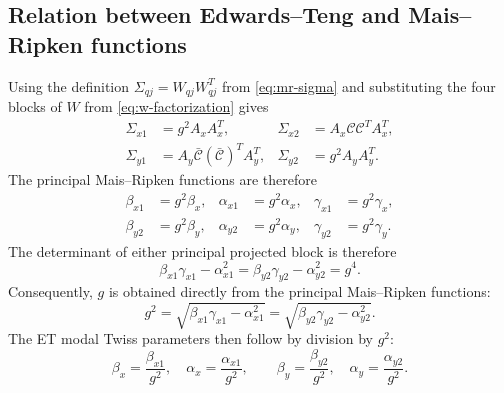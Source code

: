 \subsection{Relation between Edwards--Teng and Mais--Ripken functions}

Using the definition $\Sigma_{qj}=W_{qj}W_{qj}^T$ from
\cref{eq:mr-sigma} and substituting the four blocks of $W$ from
\cref{eq:w-factorization} gives
\begin{align}
 \Sigma_{x1}&=g^2 A_xA_x^T,
 &\Sigma_{x2}&=A_x\mathcal C\mathcal C^TA_x^T,
 \label{eq:sigmax-factorization}\\
 \Sigma_{y1}&=A_y\bar{\mathcal C}(\bar{\mathcal C})^TA_y^T,
 &\Sigma_{y2}&=g^2 A_yA_y^T.
 \label{eq:sigmay-factorization}
\end{align}
The principal Mais--Ripken functions are therefore
\begin{align}
 \beta_{x1}&=g^2\beta_x,
 &\alpha_{x1}&=g^2\alpha_x,
 &\gamma_{x1}&=g^2\gamma_x,
 \label{eq:mr-et-main-x}\\
 \beta_{y2}&=g^2\beta_y,
 &\alpha_{y2}&=g^2\alpha_y,
 &\gamma_{y2}&=g^2\gamma_y.
 \label{eq:mr-et-main-y}
\end{align}
The determinant of either principal projected block is therefore
\begin{equation}
 \beta_{x1}\gamma_{x1}-\alpha_{x1}^2
 =\beta_{y2}\gamma_{y2}-\alpha_{y2}^2
 =g^4.
 \label{eq:main-determinants}
\end{equation}
Consequently, $g$ is obtained directly from the principal Mais--Ripken functions:
\begin{equation}
 \boxed{
 g^2
 =\sqrt{\beta_{x1}\gamma_{x1}-\alpha_{x1}^2}
 =\sqrt{\beta_{y2}\gamma_{y2}-\alpha_{y2}^2}.
 }
 \label{eq:g-from-mr}
\end{equation}
The ET modal Twiss parameters then follow by division by $g^2$:
\begin{equation}
 \boxed{
 \beta_x=\frac{\beta_{x1}}{g^2},\quad
 \alpha_x=\frac{\alpha_{x1}}{g^2},\qquad
 \beta_y=\frac{\beta_{y2}}{g^2},\quad
 \alpha_y=\frac{\alpha_{y2}}{g^2}.
 }
 \label{eq:et-from-main-mr}
\end{equation}

